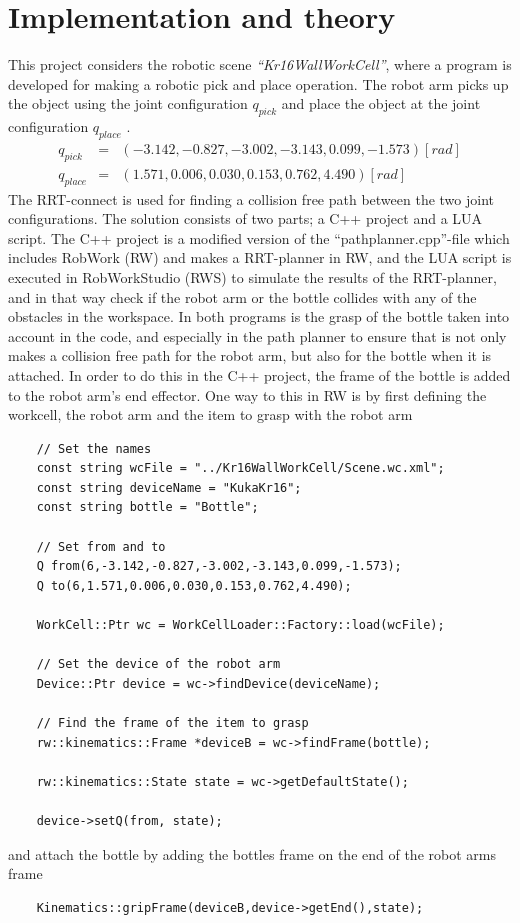 \documentclass[11pt]{article}
\begin{document}
\section{Implementation and theory}
This project considers the robotic scene \textit{“Kr16WallWorkCell”}, where a program is developed for making a robotic pick and place operation. The robot arm picks up the object using the joint configuration $q_{pick}$ and place the object at the joint configuration $q_{place}$ .
\begin{eqnarray*}
q_{pick} &=& (-3.142,-0.827,-3.002,-3.143,0.099,-1.573) [rad] \\
q_{place} &=& (1.571,0.006,0.030,0.153,0.762,4.490) [rad]
\end{eqnarray*}
The RRT-connect is used for finding a collision free path between the two joint configurations. The solution consists of two parts; a C++ project and a LUA script. The C++ project is a modified version of the “pathplanner.cpp”-file which includes RobWork (RW) and makes a RRT-planner in RW, and the LUA script is executed in RobWorkStudio (RWS) to simulate the results of the RRT-planner, and in that way check if the robot arm or the bottle collides with any of the obstacles in the workspace. In both programs is the grasp of the bottle taken into account in the code, and especially in the path planner to ensure that is not only makes a collision free path for the robot arm, but also for the bottle when it is attached. In order to do this in the C++ project, the frame of the bottle is added to the robot arm’s end effector. One way to this in RW is by first defining the workcell, the robot arm and the item to grasp with the robot arm
\begin{lstlisting}
	// Set the names
    const string wcFile = "../Kr16WallWorkCell/Scene.wc.xml";
    const string deviceName = "KukaKr16";
    const string bottle = "Bottle";
    
    // Set from and to
    Q from(6,-3.142,-0.827,-3.002,-3.143,0.099,-1.573);
    Q to(6,1.571,0.006,0.030,0.153,0.762,4.490);
    
    WorkCell::Ptr wc = WorkCellLoader::Factory::load(wcFile);
    
    // Set the device of the robot arm
    Device::Ptr device = wc->findDevice(deviceName);
	
	// Find the frame of the item to grasp
    rw::kinematics::Frame *deviceB = wc->findFrame(bottle);
    
    rw::kinematics::State state = wc->getDefaultState();
    
    device->setQ(from, state);
\end{lstlisting}
\noindent and attach the bottle by adding the bottles frame on the end of the robot arms frame
\begin{lstlisting}
    Kinematics::gripFrame(deviceB,device->getEnd(),state);
\end{lstlisting}
\end{document}
